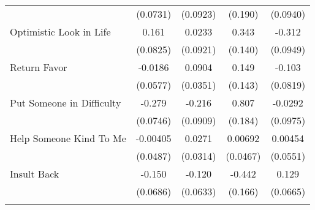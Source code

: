 {\begin{tabular}{l*{4}{c}}
            &    (0.0731)         &    (0.0923)         &     (0.190)         &    (0.0940)         \\
[1em]
Optimistic Look in Life&       0.161         &      0.0233         &       0.343\sym{*}  &      -0.312\sym{**} \\
            &    (0.0825)         &    (0.0921)         &     (0.140)         &    (0.0949)         \\
[1em]
Return Favor&     -0.0186         &      0.0904\sym{*}  &       0.149         &      -0.103         \\
            &    (0.0577)         &    (0.0351)         &     (0.143)         &    (0.0819)         \\
[1em]
Put Someone in Difficulty&      -0.279\sym{***}&      -0.216\sym{*}  &       0.807\sym{***}&     -0.0292         \\
            &    (0.0746)         &    (0.0909)         &     (0.184)         &    (0.0975)         \\
[1em]
Help Someone Kind To Me&    -0.00405         &      0.0271         &     0.00692         &     0.00454         \\
            &    (0.0487)         &    (0.0314)         &    (0.0467)         &    (0.0551)         \\
[1em]
Insult Back &      -0.150\sym{*}  &      -0.120         &      -0.442\sym{**} &       0.129         \\
            &    (0.0686)         &    (0.0633)         &     (0.166)         &    (0.0665)         \\
\hline\hline
{}\\
\end{tabular}
}
